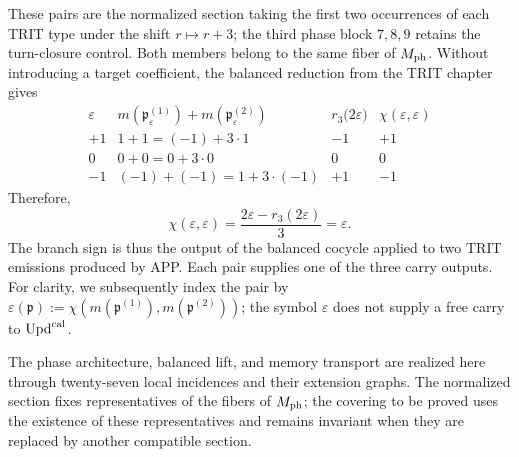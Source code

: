 These pairs are the normalized section taking the first two occurrences of
each TRIT type under the shift \(r\mapsto r+3\); the third phase block
\(7,8,9\) retains the turn-closure control. Both members belong to the same
fiber of \(M_{\rm ph}\). Without introducing a target coefficient, the
balanced reduction from the TRIT chapter gives
\begin{equation}
 \begin{array}{c|c|c|c}
 \varepsilon&m(\mathfrak p_\varepsilon^{(1)})
                  +m(\mathfrak p_\varepsilon^{(2)})
   &r_3\bigl(2\varepsilon\bigr)&
   \chi(\varepsilon,\varepsilon)\\ \hline
 +1&1+1=(-1)+3\cdot1&-1&+1\\
 0&0+0=0+3\cdot0&0&0\\
 -1&(-1)+(-1)=1+3\cdot(-1)&+1&-1
 \end{array}
 \label{eq:tres-carry-derivados-ch}
\end{equation}
Therefore,
\begin{equation}
 \chi(\varepsilon,\varepsilon)
 =\frac{2\varepsilon-r_3(2\varepsilon)}3=\varepsilon.
 \label{eq:carry-no-parametrico-ch}
\end{equation}
The branch sign is thus the output of the balanced cocycle applied to two TRIT
emissions produced by APP. Each pair supplies one of the three carry outputs.
For clarity, we subsequently index the pair by
\(\varepsilon(\mathfrak p):=
\chi(m(\mathfrak p^{(1)}),m(\mathfrak p^{(2)}))\); the symbol
\(\varepsilon\) does not supply a free carry to \(\operatorname{Upd}^{\rm cal}\).

The phase architecture, balanced lift, and memory transport are realized here
through twenty-seven local incidences and their extension graphs. The
normalized section fixes representatives of the fibers of \(M_{\rm ph}\); the
covering to be proved uses the existence of these representatives and remains
invariant when they are replaced by another compatible section.

